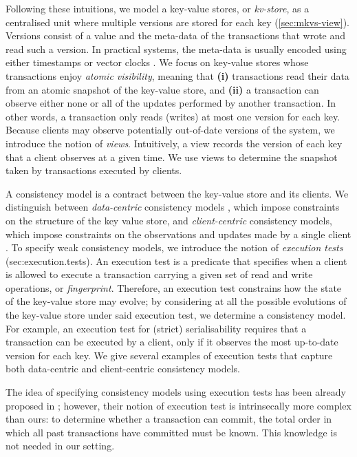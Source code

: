 Following these intuitions, we model a key-value stores, or \emph{kv-store}, as a centralised unit where multiple versions 
are stored for each key (\cref{sec:mkvs-view}). Versions consist of a value and the meta-data of the transactions that wrote and 
read such a version. In practical systems, the meta-data is usually encoded using either timestamps 
\cite{physicsnmsi,clockSI} or vector clocks \cite{gdur}. We focus on key-value stores whose transactions 
enjoy \emph{atomic visibility}, meaning that \textbf{(i)} transactions read their data from an atomic 
snapshot of the key-value store, and \textbf{(ii)} a transaction can observe either none or all 
of the updates performed by another transaction. In other words, a transaction only reads (writes) at most 
one version for each key.
Because clients may observe potentially out-of-date versions of the system, we introduce the notion of \emph{views}. 
Intuitively, a view records the version of each key that a client observes at a given time. We use views 
to determine the snapshot taken by transactions executed by clients.

A consistency model is a contract between the key-value store and its clients. We distinguish 
between \emph{data-centric} consistency models \cite{framework-concur}, which impose constraints 
on the structure of the key value store, and \emph{client-centric} consistency models, 
which impose constraints on the observations and updates made by a single client 
\cite{terry1994session}. 
To specify weak consistency models, 
we introduce the notion of \emph{execution tests} (sec:execution.tests). An execution test is a predicate 
that specifies when a client is allowed to execute a transaction carrying a given 
set of read and write operations, or \emph{fingerprint}. Therefore, an execution 
test constrains how the state of the key-value store may evolve;
by considering at all the possible evolutions of the key-value store under said execution test, 
we determine a consistency model. For example, an execution test for (strict) serialisability 
requires that a transaction can be executed by a client, only if it observes the most up-to-date 
version for each key. 
We give several examples of execution tests that capture both data-centric and 
client-centric consistency models. 

The idea of specifying consistency models using execution tests has been 
already proposed in \cite{seebelieve}; however, their notion of execution 
test is intrinsecally more complex than ours: to determine 
whether a transaction can commit, the total order in which all past transactions 
have committed must be known. This knowledge is not needed in our setting.

